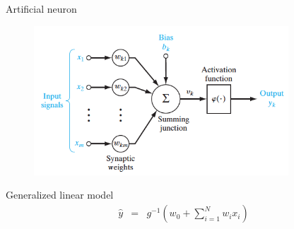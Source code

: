 \documentclass{beamer}
\begin{document}
\begin{frame}{Artificial neuron}

\begin{figure}[h!]
  \centering
  \includegraphics[width=0.85\textwidth]{images/aneuron.png}
\end{figure}

\begin{block}{Generalized linear model}
\begin{eqnarray*}
\hat{y} &=& g^{-1}\left(w_0 + \sum_{i=1}^N w_i x_i\right)
\end{eqnarray*}
\end{block}
	

\end{frame}
\end{document}
